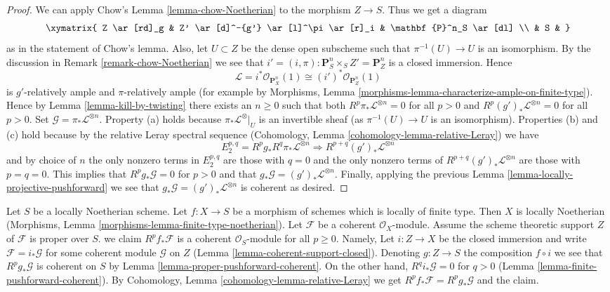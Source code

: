 \begin{proof}
\medskip\noindent
We can apply Chow's Lemma \ref{lemma-chow-Noetherian}
to the morphism $Z \to S$. Thus we get a diagram
$$
\xymatrix{
Z \ar[rd]_g & Z' \ar[d]^-{g'} \ar[l]^\pi \ar[r]_i & \mathbf{P}^n_S \ar[dl] \\
& S &
}
$$
as in the statement of Chow's lemma. Also, let $U \subset Z$ be
the dense open subscheme such that $\pi^{-1}(U) \to U$ is an isomorphism.
By the discussion in Remark \ref{remark-chow-Noetherian} we see that
$i' = (i, \pi) : \mathbf{P}^n_S \times_S Z' = \mathbf{P}^n_Z$ is
a closed immersion. Hence
$$
\mathcal{L} = i^*\mathcal{O}_{\mathbf{P}^n_X}(1) \cong
(i')^*\mathcal{O}_{\mathbf{P}^n_Z}(1)
$$
is $g'$-relatively ample and $\pi$-relatively ample (for example by
Morphisms, Lemma \ref{morphisms-lemma-characterize-ample-on-finite-type}).
Hence by Lemma \ref{lemma-kill-by-twisting}
there exists an $n \geq 0$ such that
both $R^p\pi_*\mathcal{L}^{\otimes n} = 0$ for all $p > 0$ and
$R^p(g')_*\mathcal{L}^{\otimes n} = 0$ for all $p > 0$.
Set $\mathcal{G} = \pi_*\mathcal{L}^{\otimes n}$.
Property (a) holds because $\pi_*\mathcal{L}^{\otimes}|_U$ is
an invertible sheaf (as $\pi^{-1}(U) \to U$ is an isomorphism).
Properties (b) and (c) hold because by the relative Leray
spectral sequence
(Cohomology, Lemma \ref{cohomology-lemma-relative-Leray})
we have
$$
E_2^{p, q} = R^pg_* R^q\pi_*\mathcal{L}^{\otimes n}
\Rightarrow
R^{p + q}(g')_*\mathcal{L}^{\otimes n}
$$
and by choice of $n$ the only nonzero terms in $E_2^{p, q}$ are
those with $q = 0$ and the only nonzero terms of
$R^{p + q}(g')_*\mathcal{L}^{\otimes n}$ are those with $p = q = 0$.
This implies that $R^pg_*\mathcal{G} = 0$ for $p > 0$ and
that $g_*\mathcal{G} = (g')_*\mathcal{L}^{\otimes n}$.
Finally, applying the previous
Lemma \ref{lemma-locally-projective-pushforward}
we see that $g_*\mathcal{G} = (g')_*\mathcal{L}^{\otimes n}$ is
coherent as desired.
\end{proof}

\begin{remark}
\label{remark-scheme-theoretic-support-proper}
Let $S$ be a locally Noetherian scheme.
Let $f : X \to S$ be a morphism of schemes which is locally of finite type.
Then $X$ is locally Noetherian
(Morphisms, Lemma \ref{morphisms-lemma-finite-type-noetherian}).
Let $\mathcal{F}$ be a coherent $\mathcal{O}_X$-module.
Assume the scheme theoretic support $Z$ of $\mathcal{F}$
is proper over $S$. we claim $R^pf_*\mathcal{F}$ is a coherent
$\mathcal{O}_S$-module for all $p \geq 0$.
Namely, Let $i : Z \to X$ be the closed immersion and write
$\mathcal{F} = i_*\mathcal{G}$ for some coherent module $\mathcal{G}$
on $Z$ (Lemma \ref{lemma-coherent-support-closed}).
Denoting $g : Z \to S$ the composition $f \circ i$ we see that
$R^pg_*\mathcal{G}$
is coherent on $S$ by Lemma \ref{lemma-proper-pushforward-coherent}.
On the other hand, $R^qi_*\mathcal{G} = 0$ for $q > 0$
(Lemma \ref{lemma-finite-pushforward-coherent}).
By Cohomology, Lemma \ref{cohomology-lemma-relative-Leray}
we get $R^pf_*\mathcal{F} = R^pg_*\mathcal{G}$ and the
claim.
\end{remark}

